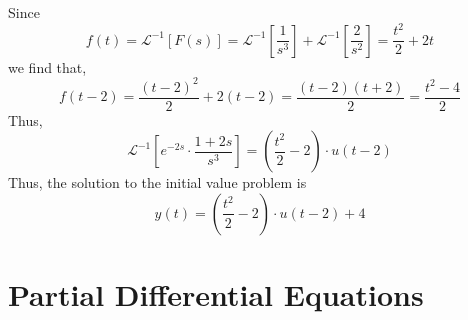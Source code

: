 \documentclass{article}
\begin{document}
\begin{enumerate}
\begin{equation*}
    \end{equation*}
    Since
    \begin{equation*}
        f(t)=\mathcal{L}^{-1}[F(s)]=\mathcal{L}^{-1}[\frac{1}{s^3}]+\mathcal{L}^{-1}[\frac{2}{s^2}]=\frac{t^2}{2}+2t
    \end{equation*}
    we find that,
    \begin{equation*}
        f(t-2)=\frac{(t-2)^2}{2}+2(t-2)=\frac{(t-2)(t+2)}{2}=\frac{t^2-4}{2}
    \end{equation*}
    Thus,
    \begin{equation*}
        \mathcal{L}^{-1}[e^{-2s}\cdot \frac{1+2s}{s^3}]=(\frac{t^2}{2}-2)\cdot u(t-2)
    \end{equation*}
    Thus, the solution to the initial value problem is
    \begin{equation*}
        y(t)=(\frac{t^2}{2}-2)\cdot u(t-2)+4
    \end{equation*}
\end{enumerate}
\newpage
\section{Partial Differential Equations}
\end{document}

